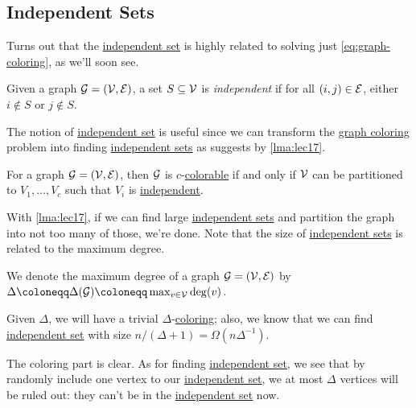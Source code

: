 \subsection{Independent Sets}
Turns out that the \hyperref[def:independent-set]{independent set} is highly related to solving just \autoref{eq:graph-coloring}, as we'll soon see.

\begin{definition}\label{def:independent-set}
	Given a graph \(\mathcal{\MakeUppercase{g}} =(\mathcal{\MakeUppercase{v}} , \mathcal{\MakeUppercase{e}} )\), a set \(S \subseteq \mathcal{\MakeUppercase{v}} \) is \emph{independent} if for all \((i, j)\in \mathcal{\MakeUppercase{e}} \), either \(i \notin S\) or \(j \notin S\).
\end{definition}

The notion of \hyperref[def:independent-set]{independent set} is useful since we can transform the \hyperref[prb:graph-coloring]{graph coloring} problem into finding \hyperref[def:independent-set]{independent sets} as suggests by \autoref{lma:lec17}.

\begin{lemma}\label{lma:lec17}
	For a graph \(\mathcal{\MakeUppercase{g}} = (\mathcal{\MakeUppercase{v}} , \mathcal{\MakeUppercase{e}} )\), then \(\mathcal{\MakeUppercase{g}} \) is \(c\)-\hyperref[def:coloring]{colorable} if and only if \(\mathcal{\MakeUppercase{v}} \) can be partitioned to \(V_1, \ldots, V_c\) such that \(V_i\) is \hyperref[def:independent-set]{independent}.
\end{lemma}

With \autoref{lma:lec17}, if we can find large \hyperref[def:independent-set]{independent sets} and partition the graph into not too many of those, we're done. Note that the size of \hyperref[def:independent-set]{independent sets} is related to the maximum degree.

\begin{notation}
	We denote the maximum degree of a graph \(\mathcal{\MakeUppercase{g}}=(\mathcal{\MakeUppercase{v}} , \mathcal{\MakeUppercase{e}} ) \) by \(\Delta \coloneqq \Delta (\mathcal{\MakeUppercase{G}} )\coloneqq \max_{v\in \mathcal{\MakeUppercase{v}} } \deg(v)\).
\end{notation}

\begin{remark}
	Given \(\Delta \), we will have a trivial \(\Delta \)-\hyperref[def:coloring]{coloring}; also, we know that we can find \hyperref[def:independent-set]{independent set} with size \(n / (\Delta +1) = \Omega (n \Delta ^{-1} )\).
\end{remark}
\begin{explanation}
	The coloring part is clear. As for finding \hyperref[def:independent-set]{independent set}, we see that by randomly include one vertex to our \hyperref[def:independent-set]{independent set}, we at most \(\Delta \) vertices will be ruled out: they can't be in the \hyperref[def:independent-set]{independent set} now.
\end{explanation}

